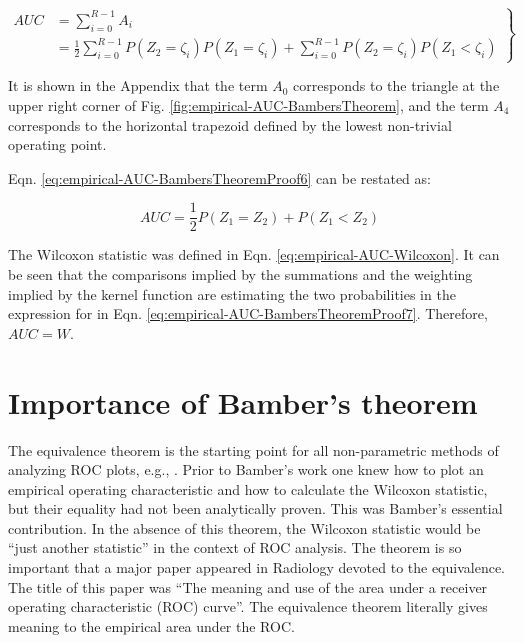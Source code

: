 \documentclass[
]{book}
\begin{document}
\begin{equation}
\left.
\begin{aligned}
AUC & = \sum_{i=0}^{R-1}A_i\\
 & = \frac{1}{2}\sum_{i=0}^{R-1}P\left ( Z_2=\zeta_i \right )P\left ( Z_1=\zeta_i \right )+\sum_{i=0}^{R-1}P\left ( Z_2=\zeta_i \right )P\left ( Z_1<\zeta_i \right )
\end{aligned}
\right \}
\label{eq:empirical-AUC-BambersTheoremProof6}
\end{equation}

It is shown in the Appendix that the term \(A_0\) corresponds to the triangle at the upper right corner of Fig. \ref{fig:empirical-AUC-BambersTheorem}, and the term \(A_4\) corresponds to the horizontal trapezoid defined by the lowest non-trivial operating point.

Eqn. \eqref{eq:empirical-AUC-BambersTheoremProof6} can be restated as:

\begin{equation}
AUC=\frac{1}{2}P\left ( Z_1 = Z_2 \right ) + P\left ( Z_1 < Z_2 \right )
\label{eq:empirical-AUC-BambersTheoremProof7}
\end{equation}

The Wilcoxon statistic was defined in Eqn. \eqref{eq:empirical-AUC-Wilcoxon}. It can be seen that the comparisons implied by the summations and the weighting implied by the kernel function are estimating the two probabilities in the expression for in Eqn. \eqref{eq:empirical-AUC-BambersTheoremProof7}. Therefore, \(AUC = W\).

\hypertarget{importance-of-bambers-theorem}{%
\section{Importance of Bamber's theorem}\label{importance-of-bambers-theorem}}

The equivalence theorem is the starting point for all non-parametric methods of analyzing ROC plots, e.g., \citep{RN2268, RN112}. Prior to Bamber's work one knew how to plot an empirical operating characteristic and how to calculate the Wilcoxon statistic, but their equality had not been analytically proven. This was Bamber's essential contribution. In the absence of this theorem, the Wilcoxon statistic would be ``just another statistic'' in the context of ROC analysis. The theorem is so important that a major paper appeared in Radiology \citep{RN1970} devoted to the equivalence. The title of this paper was ``The meaning and use of the area under a receiver operating characteristic (ROC) curve''. The equivalence theorem literally gives meaning to the empirical area under the ROC.
\end{document}
